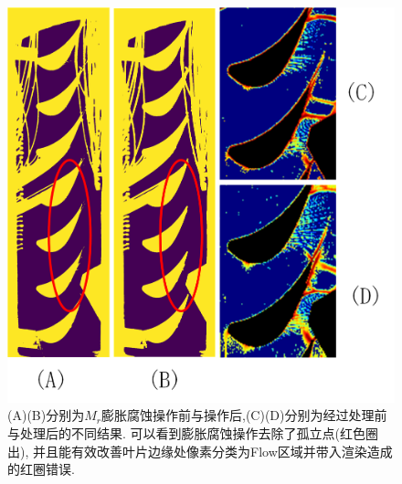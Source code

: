 \begin{figure}[t]
	\begin{center}
		\includegraphics[width=0.75\linewidth]{src/rigid}
	\end{center}
	\caption{(A)(B)分别为$M_r$膨胀腐蚀操作前与操作后,(C)(D)分别为经过处理前与处理后的不同结果. 可以看到膨胀腐蚀操作去除了孤立点(红色圈出), 并且能有效改善叶片边缘处像素分类为Flow区域并带入渲染造成的红圈错误.}
	\label{fig:rigid}	
\end{figure}